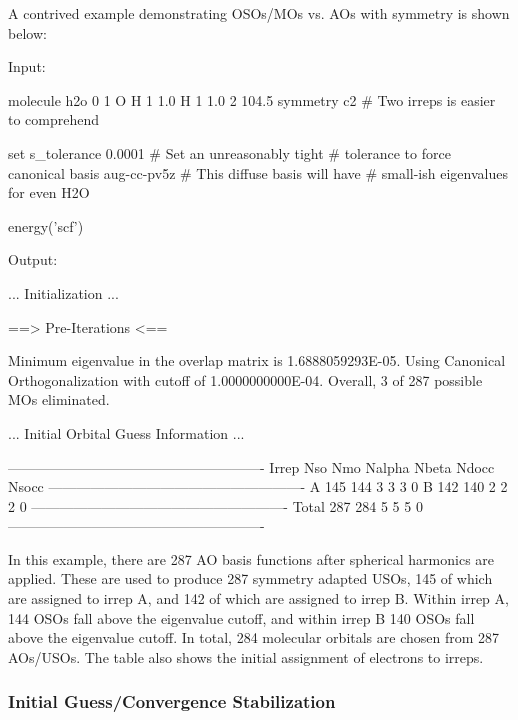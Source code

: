 A contrived example demonstrating OSOs/MOs vs. AOs with symmetry is shown below:
\begin{Snippet}
Input:

molecule h2o {
0 1
O
H 1 1.0
H 1 1.0 2 104.5
symmetry c2 # Two irreps is easier to comprehend
}

set {
s_tolerance 0.0001      # Set an unreasonably tight 
                        # tolerance to force canonical
basis aug-cc-pv5z       # This diffuse basis will have 
                        # small-ish eigenvalues for even H2O
}

energy('scf')

Output:

  ... Initialization ...

  ==> Pre-Iterations <==

  Minimum eigenvalue in the overlap matrix is 1.6888059293E-05.
  Using Canonical Orthogonalization with cutoff of 1.0000000000E-04.
  Overall, 3 of 287 possible MOs eliminated. 

  ... Initial Orbital Guess Information ...

   -------------------------------------------------------
    Irrep   Nso     Nmo     Nalpha   Nbeta   Ndocc  Nsocc
   -------------------------------------------------------
     A        145     144       3       3       3       0
     B        142     140       2       2       2       0
   -------------------------------------------------------
    Total     287     284       5       5       5       0
   -------------------------------------------------------

\end{Snippet}   
In this example, there are 287 AO basis functions after spherical harmonics are
applied. These are used to produce 287 symmetry adapted USOs, 145 of which are
assigned to irrep A, and 142 of which are assigned to irrep B. Within irrep A,
144 OSOs fall above the eigenvalue cutoff, and within irrep B 140 OSOs fall
above the eigenvalue cutoff. In total, 284 molecular orbitals are chosen from
287 AOs/USOs. The table also shows the initial assignment of electrons to
irreps.  

\subsubsection{Initial Guess/Convergence Stabilization}

